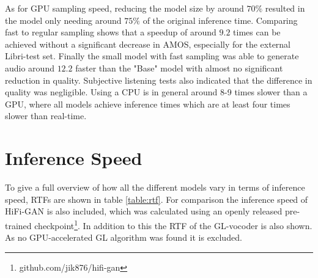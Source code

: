 \documentclass{report}
\begin{document}
As for GPU sampling speed, reducing the model size by around $70\%$ resulted in the model only needing around $75\%$ of the original inference time. Comparing fast to regular sampling shows that a speedup of around $9.2$ times can be achieved without a significant decrease in AMOS, especially for the external Libri-test set. Finally the small model with fast sampling was able to generate audio around $12.2$ faster than the "Base" model with almost no significant reduction in quality. Subjective listening tests also indicated that the difference in quality was negligible. Using a CPU is in general around 8-9 times slower than a GPU, where all models achieve inference times which are at least four times slower than real-time.

\section{Inference Speed} \label{sec:speed}

To give a full overview of how all the different models vary in terms of inference speed, RTFs are shown in table \ref{table:rtf}. For comparison the inference speed of HiFi-GAN is also included, which was calculated using an openly released pre-trained checkpoint\footnote{github.com/jik876/hifi-gan}. In addition to this the RTF of the GL-vocoder is also shown. As no GPU-accelerated GL algorithm was found it is excluded.
\end{document}
